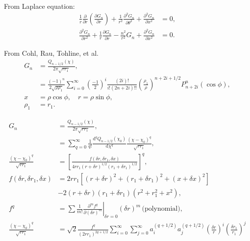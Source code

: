 \documentclass[a4paper,12pt]{article}
\newcommand{\D}{\mathrm{d}}
\begin{document}
From Laplace equation:
\begin{align}
  \frac{1}{r}\frac{\partial}{\partial r}
  \left(
    \frac{\partial G_{n}}{\partial r}
  \right)
  +
  \frac{1}{r^{2}}\frac{\partial^{2}G_{n}}{\partial \theta^{2}}
  +
  \frac{\partial^{2}G_{n}}{\partial x^{2}} &= 0,\\
  \frac{\partial^{2}G_{n}}{\partial r^{2}}
  +
  \frac{1}{r}\frac{\partial G_{n}}{\partial r}
  -
  \frac{n^{2}}{r^{2}}G_{n}
  +
  \frac{\partial^{2}G_{n}}{\partial x^{2}}
  &= 0.
\end{align}

From Cohl, Rau, Tohline, et al.
\begin{align}
  G_{n}
  &=
  \frac{Q_{n-1/2}(\chi)}{2\pi\sqrt{rr_{1}}},\\
  &=
  \frac{(-1)^{n}}{2\sqrt{\rho\rho_{1}}}
    \sum_{i=0}^{\infty}
    \left(
      \frac{-1}{2}
    \right)^{i}
    \frac{(2i)!}{i!(2n+2i)!!}
    \left(
      \frac{\rho_{1}}{\rho}
    \right)^{n+2i+1/2}
    P_{n+2i}^{n}(\cos\phi),\\
    x &= \rho\cos\phi,\quad r = \rho\sin\phi,\\
    \rho_{1} &= r_{1}.
\end{align}

\begin{align}
  G_{n} &=
  \frac{Q_{n-1/2}(\chi)}{2\pi\sqrt{rr_{1}}},\\
  &=
  \sum_{q=0}^{\infty}
  \frac{1}{q!}\frac{\D^{q} Q_{n-1/2}(\chi_{0})}{\D \chi^{q}}
  \frac{(\chi-\chi_{0})^{q}}{\sqrt{r r_{1}}},\\
  \frac{(\chi - \chi_{0})^{q}}{\sqrt{rr_{1}}}
  &=
  \left[
    \frac{f(\delta r, \delta r_{1}, \delta x)}
    {4rr_{1}(r+\delta r)^{1/2}(r_{1}+\delta r_{1})^{1/2}}
  \right]^{q},\\
  f(\delta r, \delta r_{1}, \delta x)
  &=
  2rr_{1}
  \left[
    (r+\delta r)^{2} +
    (r_{1}+\delta r_{1})^{2} +
    (x+\delta x)^{2}
  \right]\nonumber\\
  &-
  2(r+\delta r)(r_{1}+\delta r_{1})
  (r^{2} + r_{1}^{2} + x^{2}),\\
  f^{q}
  &=
  \sum \frac{1}{m!}
  \left.
    \frac{\partial^{m} f^{q}}{\partial (\delta r)^{m}}
  \right|_{\delta r=0}
  \left(\delta r\right)^{m}\,\text{(polynomial)},\\
  \frac{(\chi - \chi_{0})^{q}}{\sqrt{rr_{1}}}
  &=
  \sqrt{2}\frac{f^{q}}{(2rr_{1})^{2q+1/2}}
  \sum_{i=0}^{\infty}
  \sum_{j=0}^{\infty}
  a_{i}^{(q+1/2)}
  a_{j}^{(q+1/2)}
  \left(\frac{\delta r}{r}\right)^{i}
  \left(\frac{\delta r_{1}}{r_{1}}\right)^{j}
\end{align}
\end{document}
